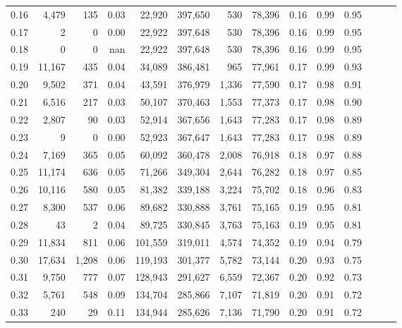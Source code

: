 \begin{tabular}{rrrrrrrrrrrrrr}
0.16 &   4,479 &    135 &  0.03 &   22,920 &  397,650 &     530 &  78,396 &  0.16 &  0.99 &      0.95 \\
0.17 &       2 &      0 &  0.00 &   22,922 &  397,648 &     530 &  78,396 &  0.16 &  0.99 &      0.95 \\
0.18 &       0 &      0 &   nan &   22,922 &  397,648 &     530 &  78,396 &  0.16 &  0.99 &      0.95 \\
0.19 &  11,167 &    435 &  0.04 &   34,089 &  386,481 &     965 &  77,961 &  0.17 &  0.99 &      0.93 \\
0.20 &   9,502 &    371 &  0.04 &   43,591 &  376,979 &   1,336 &  77,590 &  0.17 &  0.98 &      0.91 \\
0.21 &   6,516 &    217 &  0.03 &   50,107 &  370,463 &   1,553 &  77,373 &  0.17 &  0.98 &      0.90 \\
0.22 &   2,807 &     90 &  0.03 &   52,914 &  367,656 &   1,643 &  77,283 &  0.17 &  0.98 &      0.89 \\
0.23 &       9 &      0 &  0.00 &   52,923 &  367,647 &   1,643 &  77,283 &  0.17 &  0.98 &      0.89 \\
0.24 &   7,169 &    365 &  0.05 &   60,092 &  360,478 &   2,008 &  76,918 &  0.18 &  0.97 &      0.88 \\
0.25 &  11,174 &    636 &  0.05 &   71,266 &  349,304 &   2,644 &  76,282 &  0.18 &  0.97 &      0.85 \\
0.26 &  10,116 &    580 &  0.05 &   81,382 &  339,188 &   3,224 &  75,702 &  0.18 &  0.96 &      0.83 \\
0.27 &   8,300 &    537 &  0.06 &   89,682 &  330,888 &   3,761 &  75,165 &  0.19 &  0.95 &      0.81 \\
0.28 &      43 &      2 &  0.04 &   89,725 &  330,845 &   3,763 &  75,163 &  0.19 &  0.95 &      0.81 \\
0.29 &  11,834 &    811 &  0.06 &  101,559 &  319,011 &   4,574 &  74,352 &  0.19 &  0.94 &      0.79 \\
0.30 &  17,634 &  1,208 &  0.06 &  119,193 &  301,377 &   5,782 &  73,144 &  0.20 &  0.93 &      0.75 \\
0.31 &   9,750 &    777 &  0.07 &  128,943 &  291,627 &   6,559 &  72,367 &  0.20 &  0.92 &      0.73 \\
0.32 &   5,761 &    548 &  0.09 &  134,704 &  285,866 &   7,107 &  71,819 &  0.20 &  0.91 &      0.72 \\
0.33 &     240 &     29 &  0.11 &  134,944 &  285,626 &   7,136 &  71,790 &  0.20 &  0.91 &      0.72 \\

\end{tabular}
